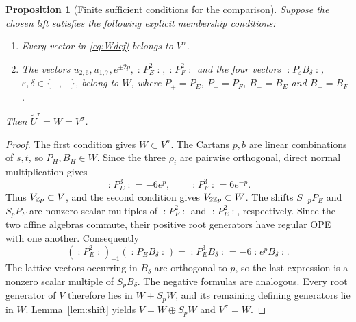 \documentclass[11pt,reqno]{amsart}
\newtheorem{proposition}[theorem]{Proposition}
\theoremstyle{definition}\newtheorem{definition}[theorem]{Definition}
\theoremstyle{remark}\newtheorem{remark}[theorem]{Remark}
\newcommand{\nn}[1]{\mathopen{:}#1\mathclose{:}}
\numberwithin{equation}{section}
\begin{document}
\begin{proposition}[Finite sufficient conditions for the comparison]\label{prop:comparison}
Suppose the chosen lift satisfies the following explicit membership conditions:
\begin{enumerate}
\item Every vector in \eqref{eq:Wdef} belongs to $V^\sigma$.
\item The vectors $u_{2,6},u_{1,7},e^{\pm2p},\nn{P_E^2},\nn{P_F^2}$ and the four vectors $\nn{P_\varepsilon B_\delta}$, $\varepsilon,\delta\in\{+,-\}$, belong to $W$, where $P_+=P_E$, $P_-=P_F$, $B_+=B_E$ and $B_-=B_F$.
\end{enumerate}
Then $\widetilde U^\tau=W=V^\sigma$.
\end{proposition}
\begin{proof}
The first condition gives $W\subset V^\sigma$. The Cartans $p,b$ are linear combinations of $s,t$, so $P_H,B_H\in W$. Since the three $\rho_i$ are pairwise orthogonal, direct normal multiplication gives
\begin{equation}\label{eq:cubic}
 \nn{P_E^3}=-6e^p,\qquad \nn{P_F^3}=6e^{-p}.
\end{equation}
Thus $V_{\mathbb Z p}\subset V$, and the second condition gives $V_{2\mathbb Z p}\subset W$.
The shifts $S_{-p}P_E$ and $S_pP_F$ are nonzero scalar multiples of $\nn{P_F^2}$ and $\nn{P_E^2}$, respectively. Since the two affine algebras commute, their positive root generators have regular OPE with one another. Consequently
\[
 (\nn{P_E^2})_{-1}(\nn{P_EB_\delta})
       =\nn{P_E^3B_\delta}
       =-6\nn{e^pB_\delta}.
\]
The lattice vectors occurring in $B_\delta$ are orthogonal to $p$, so the last expression is a nonzero scalar multiple of $S_pB_\delta$. The negative formulas are analogous. Every root generator of $V$ therefore lies in $W+S_pW$, and its remaining defining generators lie in $W$. Lemma~\ref{lem:shift} yields $V=W\oplus S_pW$ and $V^\sigma=W$.
\end{proof}
\end{document}
